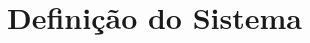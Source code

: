 \documentclass[a4paper,12pt]{scrreprt}
\begin{document}
\pagebreak



\renewcommand{\contentsname}{Índice}
\renewcommand{\listfigurename}{Índice de Figuras}
\renewcommand{\listtablename}{Índice de Tabelas}

\tableofcontents

\pagebreak

\listoffigures

\pagebreak

\listoftables

\pagebreak




\chapter{Definição do Sistema}
\end{document}
